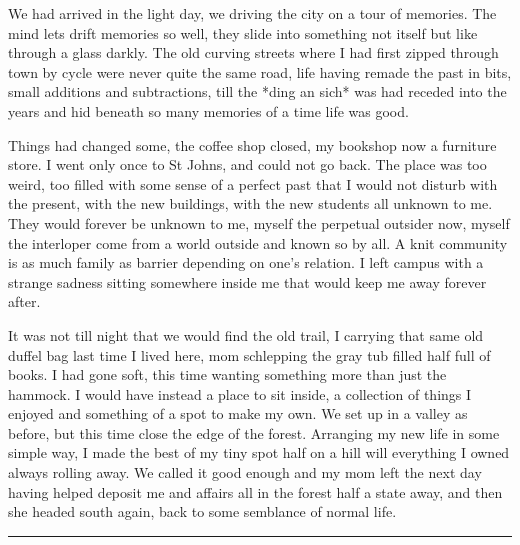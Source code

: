 \documentclass[ebook, 10pt, openright, onecolumn]{memoir}
\newcommand*\td[1]{
  \todo[inline]{
     #1 
  }
}
\newcommand*\starbreak{\fancybreak*{\Large{* * *}}}
\newcommand*\finish{\td{ ----- Finish this section -----}}
\begin{document}
We had arrived in the light day, we driving the city on a tour of memories.  The
mind lets drift memories so well, they slide into something not itself but like
through a glass darkly.  The old curving streets where I had first zipped
through town by cycle were never quite the same road, life having remade the
past in bits, small additions and subtractions, till the *ding an sich* was had
receded into the years and hid beneath so many memories of a time life was good.

Things had changed some, the coffee shop closed, my bookshop now a furniture
store. I went only once to St Johns, and could not go back.  The place was too
weird, too filled with some sense of a perfect past that I would not disturb
with the present, with the new buildings, with the new students all unknown to
me.  They would forever be unknown to me, myself the perpetual outsider now,
myself the interloper come from a world outside and known so by all.  A knit
community is as much family as barrier depending on one's relation.  I left
campus with a strange sadness sitting somewhere inside me that would keep me
away forever after.

It was not till night that we would find the old trail, I carrying that same old
duffel bag last time I lived here, mom schlepping the gray tub filled half full
of books.  I had gone soft, this time wanting something more than just the
hammock.  I would have instead a place to sit inside, a collection of things I
enjoyed and something of a spot to make my own.  We set up in a valley as
before, but this time close the edge of the forest.  Arranging my new life in
some simple way, I made the best of my tiny spot half on a hill will everything
I owned always rolling away.  We called it good enough and my mom left the next
day having helped deposit me and affairs all in the forest half a state away,
and then she headed south again, back to some semblance of normal life.  

\finish

\starbreak
\end{document}
